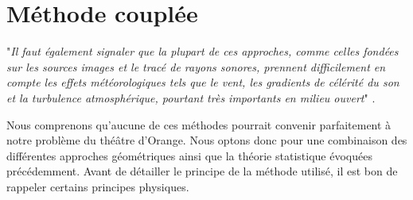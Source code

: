 	
	
\section{Méthode couplée}

"\textit{Il faut également signaler que la plupart de ces approches, comme celles fondées sur les sources images et le tracé de rayons sonores, prennent difficilement en compte les effets météorologiques tels que le vent, les gradients de célérité du son et la turbulence atmosphérique, pourtant très importants en milieu ouvert}" \cite[p. 60]{picaut}.

Nous comprenons qu'aucune de ces méthodes pourrait convenir parfaitement à notre problème du théâtre d'Orange. Nous optons donc pour une combinaison des différentes approches géométriques ainsi que la théorie statistique évoquées précédemment. Avant de détailler le principe de la méthode utilisé, il est bon de rappeler certains principes physiques.

